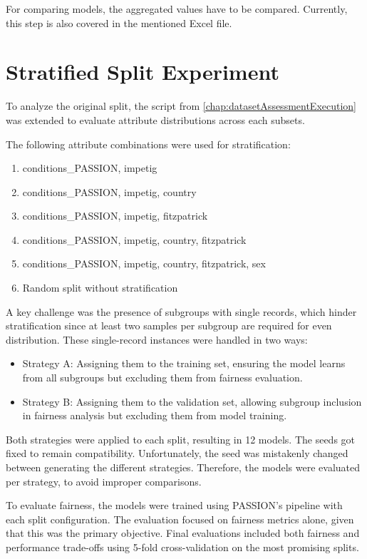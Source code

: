 \documentclass[12pt, a4paper, oneside]{book}   	%
\begin{document}
		For comparing models, the aggregated values have to be compared. Currently, this step is also covered in the mentioned Excel file.
		
		
		\section{Stratified Split Experiment}
		To analyze the original split, the script from \autoref{chap:datasetAssessmentExecution} was extended to evaluate attribute distributions across each subsets.
		
		The following attribute combinations were used for stratification:
		\begin{enumerate}
			\item conditions\_PASSION, impetig
			\item conditions\_PASSION, impetig, country
			\item conditions\_PASSION, impetig, fitzpatrick
			\item conditions\_PASSION, impetig, country, fitzpatrick
			\item conditions\_PASSION, impetig, country, fitzpatrick, sex
			\item Random split without stratification
		\end{enumerate}
		
		A key challenge was the presence of subgroups with single records, which hinder stratification since at least two samples per subgroup are required for even distribution. These single-record instances were handled in two ways:
		\begin{itemize}
			\item Strategy A: Assigning them to the training set, ensuring the model learns from all subgroups but excluding them from fairness evaluation.
			\item Strategy B: Assigning them to the validation set, allowing subgroup inclusion in fairness analysis but excluding them from model training.
		\end{itemize}
		
		Both strategies were applied to each split, resulting in 12 models. The seeds got fixed to remain compatibility. Unfortunately, the seed was mistakenly changed between generating the different strategies. Therefore, the models were evaluated per strategy, to avoid improper comparisons.
		
		To evaluate fairness, the models were trained using PASSION's pipeline with each split configuration. The evaluation focused on fairness metrics alone, given that this was the primary objective. Final evaluations included both fairness and performance trade-offs using 5-fold cross-validation on the most promising splits.
		
\end{document}
